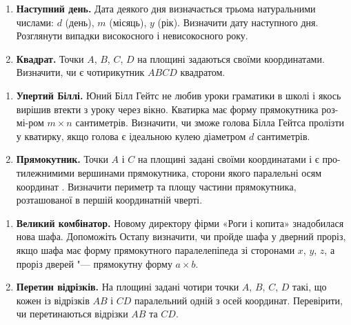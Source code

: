 \documentclass{scrreprt}
\begin{document}
	
	
	{\large
		\begin{enumerate}
			\item \textbf{Наступний день.} Дата деякого дня визначається трьома натуральними числами: $d$ (день), $m$ (місяць), $y$ (рік). Визначити дату наступного дня. Розглянути випадки високосного і невисокосного року.
			\item \textbf{Квадрат.} Точки $A$, $B$, $C$, $D$ на площині задаються своїми координатами. Визначити, чи є чотирикутник $ABCD$ квадратом.
		\end{enumerate}
	}
	
	
	\vspace{2cm}
	
	{\large
		\begin{enumerate}
			\item \textbf{Упертий Біллі.} Юний Білл Гейтс не любив уроки граматики в школі і якось вирішив втекти з уроку через вікно. Кватирка має форму прямокутника роз-мі-ром $m\times n$ сантиметрів. Визначити, чи зможе голова Білла Гейтса пролізти у кватирку, якщо голова є ідеальною кулею діаметром $d$ сантиметрів.
			\item \textbf{Прямокутник.} Точки $A$ і $C$ на площині задані своїми координатами і є про-ти\-леж\-ними\-ми вершинами прямокутника, сторони якого паралельні осям координат . Визначити периметр та площу частини прямокутника, розташованої в першій координатній чверті.
		\end{enumerate}
	}
	
	\newpage
	
	
	{\large
		\begin{enumerate}
			\item \textbf{Великий комбінатор.} Новому директору фірми «Роги і копита» знадобилася нова шафа. Допоможіть Остапу визначити, чи пройде шафа у дверний проріз, якщо шафа має форму прямокутного паралелепіпеда зі сторонами $x$, $y$, $z$, а проріз дверей "--- прямокутну форму $a\times b$.
			\item \textbf{Перетин відрізків.} На площині задані чотири точки $A$, $B$, $C$, $D$ такі, що кожен із відрізків $AB$ і $CD$ паралельний одній з осей координат. Перевірити, чи перетинаються відрізки $AB$ та $CD$.
		\end{enumerate}
	}
	\vspace{2cm}
	
\end{document}
